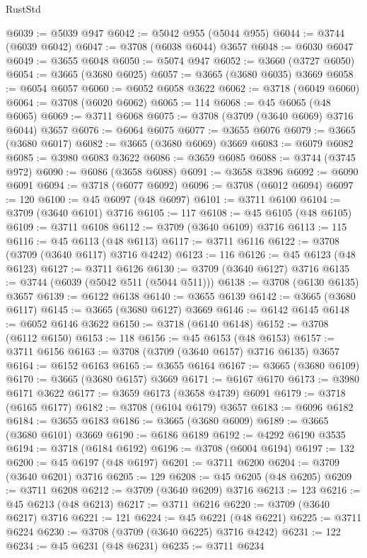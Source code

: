 \begin{lexlean}{RustStd}
\begin{coremodule}
@6039 := @5039 @947
@6042 := @5042 @955 (@5044 @955)
@6044 := @3744 (@6039 @6042)
@6047 := @3708 (@6038 @6044) @3657
@6048 := @6030 @6047
@6049 := @3655 @6048
@6050 := @5074 @947
@6052 := @3660 (@3727 @6050)
@6054 := @3665 (@3680 @6025)
@6057 := @3665 (@3680 @6035) @3669
@6058 := @6054 @6057
@6060 := @6052 @6058 @3622
@6062 := @3718 (@6049 @6060)
@6064 := @3708 (@6020 @6062)
@6065 := 114
@6068 := @45 @6065 (@48 @6065)
@6069 := @3711 @6068
@6075 := @3708 (@3709 (@3640 @6069) @3716 @6044) @3657
@6076 := @6064 @6075
@6077 := @3655 @6076
@6079 := @3665 (@3680 @6017)
@6082 := @3665 (@3680 @6069) @3669
@6083 := @6079 @6082
@6085 := @3980 @6083 @3622
@6086 := @3659 @6085
@6088 := @3744 (@3745 @972)
@6090 := @6086 (@3658 @6088)
@6091 := @3658 @3896
@6092 := @6090 @6091
@6094 := @3718 (@6077 @6092)
@6096 := @3708 (@6012 @6094)
@6097 := 120
@6100 := @45 @6097 (@48 @6097)
@6101 := @3711 @6100
@6104 := @3709 (@3640 @6101) @3716
@6105 := 117
@6108 := @45 @6105 (@48 @6105)
@6109 := @3711 @6108
@6112 := @3709 (@3640 @6109) @3716
@6113 := 115
@6116 := @45 @6113 (@48 @6113)
@6117 := @3711 @6116
@6122 := @3708 (@3709 (@3640 @6117) @3716 @4242)
@6123 := 116
@6126 := @45 @6123 (@48 @6123)
@6127 := @3711 @6126
@6130 := @3709 (@3640 @6127) @3716
@6135 := @3744 (@6039 (@5042 @511 (@5044 @511)))
@6138 := @3708 (@6130 @6135) @3657
@6139 := @6122 @6138
@6140 := @3655 @6139
@6142 := @3665 (@3680 @6117)
@6145 := @3665 (@3680 @6127) @3669
@6146 := @6142 @6145
@6148 := @6052 @6146 @3622
@6150 := @3718 (@6140 @6148)
@6152 := @3708 (@6112 @6150)
@6153 := 118
@6156 := @45 @6153 (@48 @6153)
@6157 := @3711 @6156
@6163 := @3708 (@3709 (@3640 @6157) @3716 @6135) @3657
@6164 := @6152 @6163
@6165 := @3655 @6164
@6167 := @3665 (@3680 @6109)
@6170 := @3665 (@3680 @6157) @3669
@6171 := @6167 @6170
@6173 := @3980 @6171 @3622
@6177 := @3659 @6173 (@3658 @4739) @6091
@6179 := @3718 (@6165 @6177)
@6182 := @3708 (@6104 @6179) @3657
@6183 := @6096 @6182
@6184 := @3655 @6183
@6186 := @3665 (@3680 @6009)
@6189 := @3665 (@3680 @6101) @3669
@6190 := @6186 @6189
@6192 := @4292 @6190 @3535
@6194 := @3718 (@6184 @6192)
@6196 := @3708 (@6004 @6194)
@6197 := 132
@6200 := @45 @6197 (@48 @6197)
@6201 := @3711 @6200
@6204 := @3709 (@3640 @6201) @3716
@6205 := 129
@6208 := @45 @6205 (@48 @6205)
@6209 := @3711 @6208
@6212 := @3709 (@3640 @6209) @3716
@6213 := 123
@6216 := @45 @6213 (@48 @6213)
@6217 := @3711 @6216
@6220 := @3709 (@3640 @6217) @3716
@6221 := 121
@6224 := @45 @6221 (@48 @6221)
@6225 := @3711 @6224
@6230 := @3708 (@3709 (@3640 @6225) @3716 @4242)
@6231 := 122
@6234 := @45 @6231 (@48 @6231)
@6235 := @3711 @6234

\end{coremodule}
\end{lexlean}
